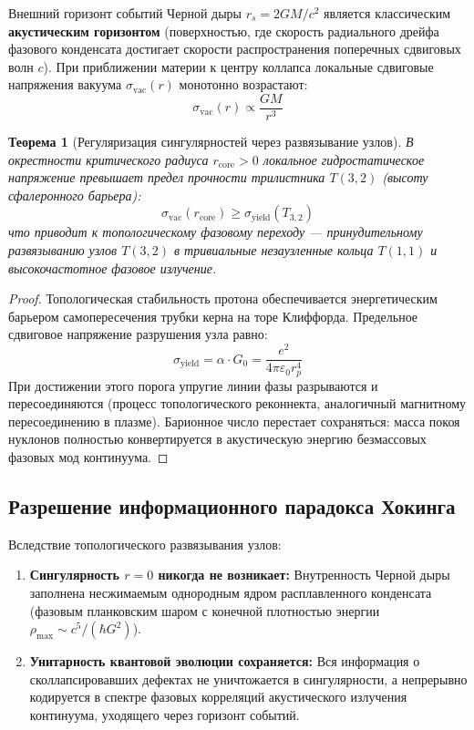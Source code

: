\documentclass[12pt,a4paper]{article}
\newtheorem{theorem}{Теорема}
\begin{document}
Внешний горизонт событий Черной дыры $r_s = 2GM/c^2$ является классическим \textbf{акустическим горизонтом} (поверхностью, где скорость радиального дрейфа фазового конденсата достигает скорости распространения поперечных сдвиговых волн $c$). При приближении материи к центру коллапса локальные сдвиговые напряжения вакуума $\sigma_{\text{vac}}(r)$ монотонно возрастают:
\begin{equation}
	\sigma_{\text{vac}}(r) \propto \frac{G M}{r^3}
\end{equation}

\begin{theorem}[Регуляризация сингулярностей через развязывание узлов]
	В окрестности критического радиуса $r_{\mathrm{core}} > 0$ локальное гидростатическое напряжение превышает предел прочности трилистника $T(3,2)$ (высоту сфалеронного барьера):
	\begin{equation}
		\sigma_{\mathrm{vac}}(r_{\mathrm{core}}) \ge \sigma_{\mathrm{yield}}(T_{3,2})
	\end{equation}
	что приводит к топологическому фазовому переходу — принудительному развязыванию узлов $T(3,2)$ в тривиальные незаузленные кольца $T(1,1)$ и высокочастотное фазовое излучение.
\end{theorem}

\begin{proof}
	Топологическая стабильность протона обеспечивается энергетическим барьером самопересечения трубки керна на торе Клиффорда. Предельное сдвиговое напряжение разрушения узла равно:
	\begin{equation}
		\sigma_{\text{yield}} = \alpha \cdot G_0 = \frac{e^2}{4\pi\varepsilon_0 r_p^4}
	\end{equation}
	При достижении этого порога упругие линии фазы разрываются и пересоединяются (процесс топологического реконнекта, аналогичный магнитному пересоединению в плазме). Барионное число перестает сохраняться: масса покоя нуклонов полностью конвертируется в акустическую энергию безмассовых фазовых мод континуума.
\end{proof}

\subsection{Разрешение информационного парадокса Хокинга}
Вследствие топологического развязывания узлов:
\begin{enumerate}
	\item \textbf{Сингулярность $r=0$ никогда не возникает:} Внутренность Черной дыры заполнена несжимаемым однородным ядром расплавленного конденсата (фазовым планковским шаром с конечной плотностью энергии $\rho_{\text{max}} \sim c^5 / (\hbar G^2)$).
	\item \textbf{Унитарность квантовой эволюции сохраняется:} Вся информация о сколлапсировавших дефектах не уничтожается в сингулярности, а непрерывно кодируется в спектре фазовых корреляций акустического излучения континуума, уходящего через горизонт событий.
\end{enumerate}
\end{document}
